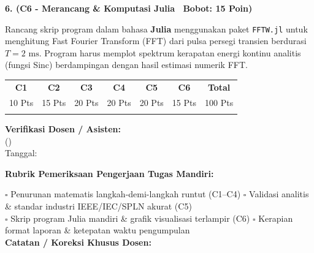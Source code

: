 \documentclass[10pt,a4paper]{article}
\begin{document}
\vspace{3.5mm}

\noindent\textbf{6. (C6 - Merancang \& Komputasi Julia \textbar\ Bobot: 15 Poin)}\par\vspace{0.8mm}
{\footnotesize Rancang skrip program dalam bahasa \textbf{Julia} menggunakan paket \texttt{FFTW.jl} untuk menghitung Fast Fourier Transform (FFT) dari pulsa persegi transien berdurasi $T = 2\text{ ms}$. Program harus memplot spektrum kerapatan energi kontinu analitis (fungsi Sinc) berdampingan dengan hasil estimasi numerik FFT.}\par

\vfill

\noindent\begin{minipage}[b]{0.62\textwidth}%
  \centering
  \scriptsize
  \begin{tabular}{|c|c|c|c|c|c|c|}
    \hline
    \rowcolor{unibblue}
    \textbf{\color{white}C1} & \textbf{\color{white}C2} & \textbf{\color{white}C3} & \textbf{\color{white}C4} & \textbf{\color{white}C5} & \textbf{\color{white}C6} & \textbf{\color{white}Total} \\
    \rowcolor{unibblue!10}
    10 Pts & 15 Pts & 20 Pts & 20 Pts & 20 Pts & 15 Pts & 100 Pts \\
    \hline
    & & & & & & \\[3mm]
    \hline
  \end{tabular}%
\end{minipage}%
\hfill%
\begin{minipage}[b]{0.35\textwidth}%
  \centering
  \scriptsize
  \textbf{Verifikasi Dosen / Asisten:}\\[6mm]
  (\dotfill)\\[1mm]
  \tiny Tanggal: \dotfill
\end{minipage}\par

\vspace{2mm}
\begin{tcolorbox}[colback=white,colframe=unibblue!40!black,colbacktitle=unibblue!10,coltitle=unibblue,boxrule=0.5pt,arc=2pt,left=5pt,right=5pt,top=3pt,bottom=3pt,title=\textbf{\tiny Catatan Evaluasi \& Umpan Balik Dosen Pengampu}]
  \tiny
  \textbf{Rubrik Pemeriksaan Pengerjaan Tugas Mandiri:}\par\vspace{0.8mm}
  $\square$ Penurunan matematis langkah-demi-langkah runtut (C1--C4) \hfill $\square$ Validasi analitis \& standar industri IEEE/IEC/SPLN akurat (C5)\\[0.8mm]
  $\square$ Skrip program Julia mandiri \& grafik visualisasi terlampir (C6) \hfill $\square$ Kerapian format laporan \& ketepatan waktu pengumpulan\\[2.0mm]
  \textbf{Catatan / Koreksi Khusus Dosen:}\\[1.6cm]
\end{tcolorbox}
\end{document}
